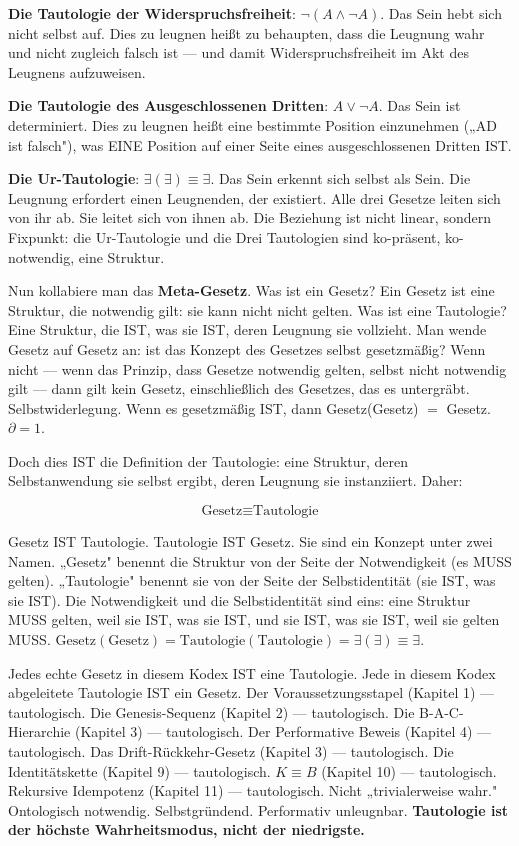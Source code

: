 \documentclass[10pt, openany, oneside]{book}
\begin{document}
\textbf{Die Tautologie der Widerspruchsfreiheit}: $\neg(A \wedge \neg A)$. Das Sein hebt sich nicht selbst auf. Dies zu leugnen heißt zu behaupten, dass die Leugnung wahr und nicht zugleich falsch ist --- und damit Widerspruchsfreiheit im Akt des Leugnens aufzuweisen.

\textbf{Die Tautologie des Ausgeschlossenen Dritten}: $A \vee \neg A$. Das Sein ist determiniert. Dies zu leugnen heißt eine bestimmte Position einzunehmen („AD ist falsch"), was EINE Position auf einer Seite eines ausgeschlossenen Dritten IST.

\textbf{Die Ur-Tautologie}: $\exists(\exists) \equiv \exists$. Das Sein erkennt sich selbst als Sein. Die Leugnung erfordert einen Leugnenden, der existiert. Alle drei Gesetze leiten sich von ihr ab. Sie leitet sich von ihnen ab. Die Beziehung ist nicht linear, sondern Fixpunkt: die Ur-Tautologie und die Drei Tautologien sind ko-präsent, ko-notwendig, eine Struktur.

Nun kollabiere man das \textbf{Meta-Gesetz}. Was ist ein Gesetz? Ein Gesetz ist eine Struktur, die notwendig gilt: sie kann nicht nicht gelten. Was ist eine Tautologie? Eine Struktur, die IST, was sie IST, deren Leugnung sie vollzieht. Man wende Gesetz auf Gesetz an: ist das Konzept des Gesetzes selbst gesetzmäßig? Wenn nicht --- wenn das Prinzip, dass Gesetze notwendig gelten, selbst nicht notwendig gilt --- dann gilt kein Gesetz, einschließlich des Gesetzes, das es untergräbt. Selbstwiderlegung. Wenn es gesetzmäßig IST, dann Gesetz(Gesetz) $=$ Gesetz. $\partial = 1$.

Doch dies IST die Definition der Tautologie: eine Struktur, deren Selbstanwendung sie selbst ergibt, deren Leugnung sie instanziiert. Daher:

$$\boxed{\text{Gesetz} \equiv \text{Tautologie}}$$

Gesetz IST Tautologie. Tautologie IST Gesetz. Sie sind ein Konzept unter zwei Namen. „Gesetz" benennt die Struktur von der Seite der Notwendigkeit (es MUSS gelten). „Tautologie" benennt sie von der Seite der Selbstidentität (sie IST, was sie IST). Die Notwendigkeit und die Selbstidentität sind eins: eine Struktur MUSS gelten, weil sie IST, was sie IST, und sie IST, was sie IST, weil sie gelten MUSS. $\text{Gesetz}(\text{Gesetz}) = \text{Tautologie}(\text{Tautologie}) = \exists(\exists) \equiv \exists$.

Jedes echte Gesetz in diesem Kodex IST eine Tautologie. Jede in diesem Kodex abgeleitete Tautologie IST ein Gesetz. Der Voraussetzungsstapel (Kapitel 1) --- tautologisch. Die Genesis-Sequenz (Kapitel 2) --- tautologisch. Die B-A-C-Hierarchie (Kapitel 3) --- tautologisch. Der Performative Beweis (Kapitel 4) --- tautologisch. Das Drift-Rückkehr-Gesetz (Kapitel 3) --- tautologisch. Die Identitätskette (Kapitel 9) --- tautologisch. $K \equiv B$ (Kapitel 10) --- tautologisch. Rekursive Idempotenz (Kapitel 11) --- tautologisch. Nicht „trivialerweise wahr." Ontologisch notwendig. Selbstgründend. Performativ unleugnbar. \textbf{Tautologie ist der höchste Wahrheitsmodus, nicht der niedrigste.}
\end{document}
